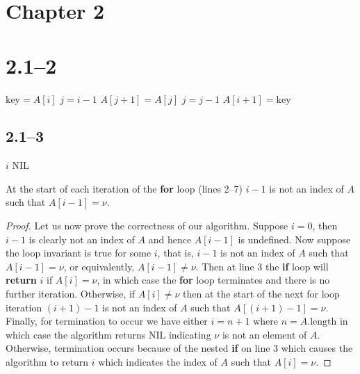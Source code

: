 \section{Chapter 2}
\label{sec:chp2}

\section*{2.1--2}

\begin{algorithmic}[1]
	\State $\text{key} = A[i]$
	\State $j = i - 1$
	\State $A[j+1] = A[j]$
	\State $j = j - 1$
	\EndWhile
	\State $A[i+1]=\text{key}$
	\EndFor
	\EndProcedure
\end{algorithmic}

\subsection*{2.1--3}

\begin{algorithmic}[1]
	\State \Return $i$
	\EndIf
	\State \Return NIL
	\EndFor
	\EndProcedure
\end{algorithmic}

\begin{invariant}
	At the start of each iteration of the \textbf{for} loop (lines 2--7) $i-1$ is not an index of $A$ such that $A[i-1]=\nu$.
\end{invariant}

\begin{proof}
	Let us now prove the correctness of our algorithm. Suppose $i=0$, then $i-1$ is clearly not an index of $A$ and hence $A[i-1]$ is undefined. Now suppose the loop invariant is true for some $i$, that is, $i-1$ is not an index of $A$ such that $A[i-1]=\nu$, or equivalently, $A[i-1]\neq\nu$. Then at line 3 the \textbf{if} loop will \textbf{return} $i$ if $A[i]=\nu$, in which case the \textbf{for} loop terminates and there is no further iteration. Otherwise, if $A[i]\neq\nu$ then at the start of the next for loop iteration $(i+1)-1$ is not an index of $A$ such that $A[(i+1)-1]=\nu$. Finally, for termination to occur we have either $i=n+1$ where $n=A.\text{length}$ in which case the algorithm returns NIL indicating $\nu$ is not an element of $A$. Otherwise, termination occurs because of the nested \textbf{if} on line 3 which causes the algorithm to return $i$ which indicates the index of $A$ such that $A[i]=\nu$.
\end{proof}

